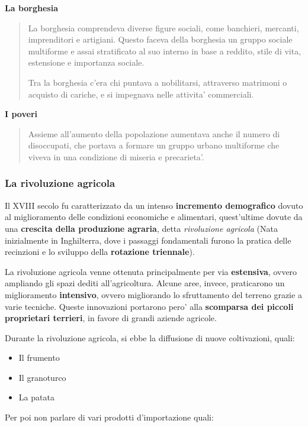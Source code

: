 \documentclass{article}
\begin{document}
{{    \textbf{La borghesia}
    \begin{quote}
      La borghesia comprendeva diverse figure sociali, come banchieri, mercanti, imprenditori e artigiani. Questo faceva della borghesia un gruppo sociale multiforme e assai stratificato al suo interno in base a reddito, stile di vita, estensione e importanza sociale.

      Tra la borghesia c'era chi puntava a nobilitarsi, attraverso matrimoni o acquisto di cariche, e si impegnava nelle attivita' commerciali.
    \end{quote}

    \textbf{I poveri}
    \begin{quote}
      Assieme all'aumento della popolazione aumentava anche il numero di disoccupati, che portava a formare un gruppo urbano multiforme che viveva in una condizione di miseria e precarieta'.
    \end{quote}

    \subsubsection{La rivoluzione agricola}
    Il XVIII secolo fu caratterizzato da un intenso \textbf{incremento demografico} dovuto al miglioramento delle condizioni economiche e alimentari, quest'ultime dovute da una \textbf{crescita della produzione agraria}, detta \textit{rivoluzione agricola} \small{(Nata inizialmente in Inghilterra, dove i passaggi fondamentali furono la pratica delle recinzioni e lo sviluppo della \textbf{rotazione triennale})}.

    La rivoluzione agricola venne ottenuta principalmente per via \textbf{estensiva}, ovvero ampliando gli spazi dediti all'agricoltura. Alcune aree, invece, praticarono un miglioramento \textbf{intensivo}, ovvero migliorando lo sfruttamento del terreno grazie a varie tecniche. Queste innovazioni portarono pero' alla \textbf{scomparsa dei piccoli proprietari terrieri}, in favore di grandi aziende agricole.

    Durante la rivoluzione agricola, si ebbe la diffusione di nuove coltivazioni, quali:

    \begin{itemize}
      \item Il frumento
      \item Il granoturco
      \item La patata
    \end{itemize}

    Per poi non parlare di vari prodotti d'importazione quali:

}}
\end{document}
